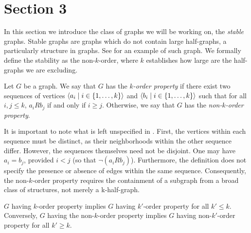 \section{Section 3} \label{sec:section_3}

    In this section we introduce the class of graphs we will be working on, the \emph{stable} graphs.
    Stable graphs are graphs which do not contain 
    large half-graphs, a particularly  structure in graphs. 
    See  for an example of such graph. 
    We formally define the stability as the non-$k$-order, where $k$ establishes how large are the half-graphs we are
    excluding.

    \begin{definition} \label{def:k_order_property}
        Let $G$ be a graph.
        We say that $G$ has the \emph{$k$-order property} if there exist two sequences of vertices
        $\left< a_i \mid i \in \{ 1, \dots, k \} \right>$ and $\left< b_i \mid i \in \{ 1, \dots, k \} \right>$ such that
        for all $i,j \leq k$, $a_i R b_j$ if and only if $i \geq j$.
        Otherwise, we say that $G$ has the \emph{non-$k$-order property}.
    \end{definition}

    \begin{remark}
        It is important to note what is left unspecified in .
        First, the vertices within each sequence must be distinct, as their neighborhoods within the other sequence
        differ.
        However, the sequences themselves need not be disjoint.
        One may have $a_i=b_j$, provided $i < j$ (so that $\neg(a_i R b_j)$).
        Furthermore, the definition does not specify the presence or absence of edges within the same sequence.
        Consequently, the non-$k$-order property requires the containment of a subgraph from a broad class of structures,
        not merely a k-half-graph.
    \end{remark}

    \begin{remark}
        $G$ having $k$-order property implies $G$ having $k'$-order property for all $k' \leq k$.
        Conversely, $G$ having the non-$k$-order property implies $G$ having non-$k'$-order property for all $k' \geq k$.
    \end{remark}

